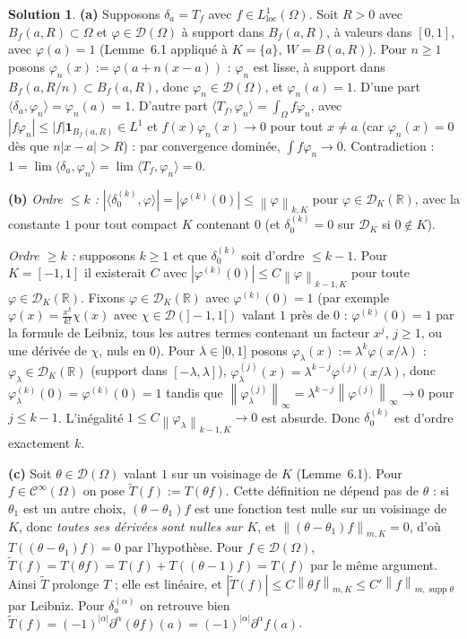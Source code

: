 \documentclass[11pt,a4paper]{article}
\newcommand{\R}{\mathbb{R}}
\newcommand{\Bf}{B_f}
\newcommand{\norm}[1]{\left\|#1\right\|}
\newcommand{\Cinf}{\mathcal{C}^\infty}
\DeclareMathOperator{\supp}{supp}
\newcommand{\D}{\mathcal{D}}
\theoremstyle{definition}
\newtheorem*{solution}{Solution}
\begin{document}
\begin{solution}
\noindent\textbf{(a)} Supposons $\delta_a=T_f$ avec $f\in L^1_{\mathrm{loc}}(\Omega)$. Soit $R>0$ avec $\Bf(a,R)\subset\Omega$ et $\varphi\in\D(\Omega)$ à support dans $\Bf(a,R)$, à valeurs dans $[0,1]$, avec $\varphi(a)=1$ (Lemme~6.1 appliqué à $K=\{a\}$, $W=B(a,R)$). Pour $n\ge1$ posons $\varphi_n(x):=\varphi(a+n(x-a))$ : $\varphi_n$ est lisse, à support dans $\Bf(a,R/n)\subset\Bf(a,R)$, donc $\varphi_n\in\D(\Omega)$, et $\varphi_n(a)=1$. D'une part $\langle\delta_a,\varphi_n\rangle=\varphi_n(a)=1$. D'autre part $\langle T_f,\varphi_n\rangle=\int_\Omega f\varphi_n$, avec $|f\varphi_n|\le|f|\mathbf 1_{\Bf(a,R)}\in L^1$ et $f(x)\varphi_n(x)\to0$ pour tout $x\ne a$ (car $\varphi_n(x)=0$ dès que $n|x-a|>R$) : par convergence dominée, $\int f\varphi_n\to0$. Contradiction : $1=\lim\langle\delta_a,\varphi_n\rangle=\lim\langle T_f,\varphi_n\rangle=0$.

\medskip
\noindent\textbf{(b)} \emph{Ordre $\le k$ :} $|\langle\delta_0^{(k)},\varphi\rangle|=|\varphi^{(k)}(0)|\le\norm\varphi_{k,K}$ pour $\varphi\in\D_K(\R)$, avec la constante $1$ pour tout compact $K$ contenant $0$ (et $\delta_0^{(k)}=0$ sur $\D_K$ si $0\notin K$).

\emph{Ordre $\ge k$ :} supposons $k\ge1$ et que $\delta_0^{(k)}$ soit d'ordre $\le k-1$. Pour $K=[-1,1]$ il existerait $C$ avec $|\varphi^{(k)}(0)|\le C\norm\varphi_{k-1,K}$ pour toute $\varphi\in\D_K(\R)$. Fixons $\varphi\in\D_K(\R)$ avec $\varphi^{(k)}(0)=1$ (par exemple $\varphi(x)=\frac{x^k}{k!}\chi(x)$ avec $\chi\in\D(]-1,1[)$ valant $1$ près de $0$ : $\varphi^{(k)}(0)=1$ par la formule de Leibniz, tous les autres termes contenant un facteur $x^{j}$, $j\ge1$, ou une dérivée de $\chi$, nuls en $0$). Pour $\lambda\in]0,1]$ posons $\varphi_\lambda(x):=\lambda^k\varphi(x/\lambda)$ : $\varphi_\lambda\in\D_K(\R)$ (support dans $[-\lambda,\lambda]$), $\varphi_\lambda^{(j)}(x)=\lambda^{k-j}\varphi^{(j)}(x/\lambda)$, donc $\varphi_\lambda^{(k)}(0)=\varphi^{(k)}(0)=1$ tandis que $\norm{\varphi_\lambda^{(j)}}_\infty=\lambda^{k-j}\norm{\varphi^{(j)}}_\infty\to0$ pour $j\le k-1$. L'inégalité $1\le C\norm{\varphi_\lambda}_{k-1,K}\to0$ est absurde. Donc $\delta_0^{(k)}$ est d'ordre exactement $k$.

\medskip
\noindent\textbf{(c)} Soit $\theta\in\D(\Omega)$ valant $1$ sur un voisinage de $K$ (Lemme~6.1). Pour $f\in\Cinf(\Omega)$ on pose $\tilde T(f):=T(\theta f)$. Cette définition ne dépend pas de $\theta$ : si $\theta_1$ est un autre choix, $(\theta-\theta_1)f$ est une fonction test nulle sur un voisinage de $K$, donc \emph{toutes ses dérivées sont nulles sur $K$}, et $\norm{(\theta-\theta_1)f}_{m,K}=0$, d'où $T((\theta-\theta_1)f)=0$ par l'hypothèse. Pour $f\in\D(\Omega)$, $\tilde T(f)=T(\theta f)=T(f)+T((\theta-1)f)=T(f)$ par le même argument. Ainsi $\tilde T$ prolonge $T$ ; elle est linéaire, et $|\tilde T(f)|\le C\norm{\theta f}_{m,K}\le C'\norm f_{m,\supp\theta}$ par Leibniz. Pour $\delta_a^{(\alpha)}$ on retrouve bien $\tilde T(f)=(-1)^{|\alpha|}\partial^\alpha(\theta f)(a)=(-1)^{|\alpha|}\partial^\alpha f(a)$.
\end{solution}
\end{document}
